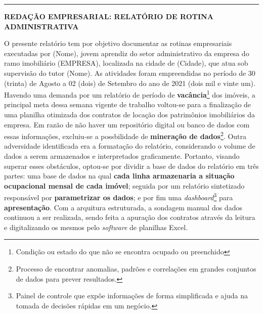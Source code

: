 \documentclass[a4paper,10pt,titlepage]{article}
\begin{document}
 

\newcommand{\HRule}{\rule{\linewidth}{0.5mm}}
\HRule
\begin{large}
    \begin{justify}
        \begin{onehalfspace}
    \begin{center}
        \textbf{REDAÇÃO EMPRESARIAL: RELATÓRIO DE ROTINA ADMINISTRATIVA}\\[0.5cm]
    \end{center}
            \noindent O presente relatório tem por objetivo documentar as rotinas empresariais executadas por (Nome), jovem aprendiz do setor administrativo da empresa do ramo imobiliário (EMPRESA), localizada na cidade de (Cidade), que atua sob supervisão do tutor (Nome). As atividades foram empreendidas no período de 30 (trinta) de Agosto a 02 (dois) de Setembro do ano de 2021 (dois mil e vinte um).\\
            
            \noindent Havendo uma demanda por um relatório de período de \textbf{vacância}\footnote[1]{Condição ou estado do que não se encontra ocupado ou preenchido} dos imóveis, a principal meta dessa semana vigente de trabalho voltou-se para a finalização de uma planilha otimizada dos contratos de locação dos patrimônios imobiliários da empresa. Em razão de não haver um repositório digital ou banco de dados com essas informações, excluiu-se a possbilidade de \textbf{mineração de dados}\footnote[2]{Processo de encontrar anomalias, padrões e correlações em grandes conjuntos de dados para prever resultados.}. Outra adversidade identificada era a formatação do relatório, considerando o volume de dados a serem armazenados e interpretados graficamente. Portanto, visando superar esses obstáculos, optou-se por dividir a base de dados do relatório em três partes: uma base de dados na qual \textbf{cada linha armazenaria a situação ocupacional mensal de cada imóvel}; seguida por um relatório sintetizado responsável por \textbf{parametrizar os dados}; e por fim uma \textit{dashboard}\footnote[3]{Painel de controle que expõe informações de forma simplificada e ajuda na tomada de decisões rápidas em um negócio.} para \textbf{apresentação}. Com a arquitura estruturada, a sondagem manual dos dados continuou a ser realizada, sendo feita a apuração dos contratos através da leitura e digitalizando os mesmos pelo \textit{software} de planilhas Excel.
        \end{onehalfspace}
    \end{justify}
\end{large}
        
\end{document}
